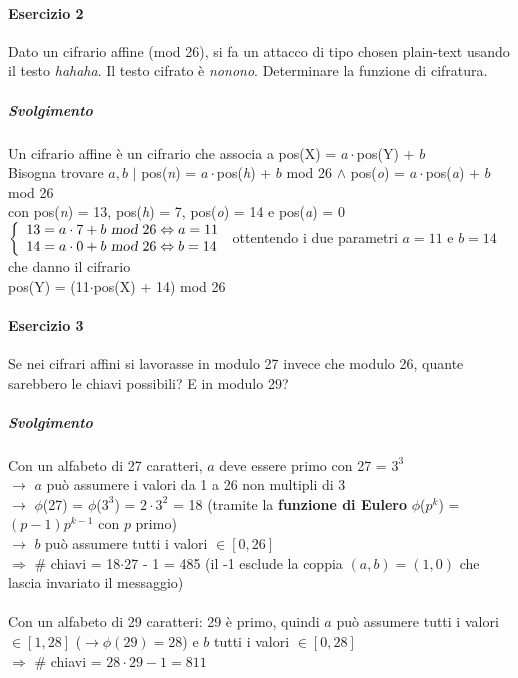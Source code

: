 \documentclass[10pt]{book}
\begin{document}
\paragraph{Esercizio 2} Dato un cifrario affine (mod 26), si fa un attacco di tipo chosen plain-text usando il testo \textit{hahaha}. Il testo cifrato è \textit{nonono}. Determinare la funzione di cifratura.
\subparagraph{Svolgimento} Un cifrario affine è un cifrario che associa a pos(X) = $a\cdot$pos(Y) + $b$\\
Bisogna trovare $a,b$ $|$ pos(\textit{n}) = $a\cdot$pos(\textit{h}) + $b$ mod 26 $\wedge$ pos(\textit{o}) = $a\cdot$pos(\textit{a}) + $b$ mod 26\\con pos(\textit{n}) = 13, pos(\textit{h}) = 7, pos(\textit{o}) = 14 e pos(\textit{a}) = 0\\
$\left\{
\begin{array}{l}
	13 = a\cdot7+b\textsl{ mod }26 \Leftrightarrow a = 11\\
	14 = a\cdot0+b\textsl{ mod }26 \Leftrightarrow b = 14
\end{array}
\right.$ ottentendo i due parametri $a = 11$ e $b = 14$ che danno il cifrario\\pos(Y) = (11$\cdot$pos(X) + 14) mod 26
\paragraph{Esercizio 3} Se nei cifrari affini si lavorasse in modulo 27 invece che modulo 26, quante sarebbero le chiavi possibili? E in modulo 29?
\subparagraph{Svolgimento} Con un alfabeto di 27 caratteri, $a$ deve essere primo con 27 = $3^3$\\$\rightarrow$ $a$ può assumere i valori da 1 a 26 non multipli di 3\\$\longrightarrow$ $\phi$(27) = $\phi$($3^3$) = $2\cdot3^2$ = 18 (tramite la \textbf{funzione di Eulero} $\phi$($p^k$) = $(p-1)p^{k-1}$ con $p$ primo)\\
$\rightarrow$ $b$ può assumere tutti i valori $\in[0, 26]$\\
$\Rightarrow$ \# chiavi = 18$\cdot$27 - 1 = 485 (il -1 esclude la coppia $(a,b) = (1,0)$ che lascia invariato il messaggio)\\\\
Con un alfabeto di 29 caratteri: 29 è primo, quindi $a$ può assumere tutti i valori $\in [1, 28]$ ($\rightarrow \phi(29) = 28$) e $b$ tutti i valori $\in [0, 28]$\\
$\Rightarrow$ \# chiavi = $28\cdot29 - 1 = 811$
\end{document}
